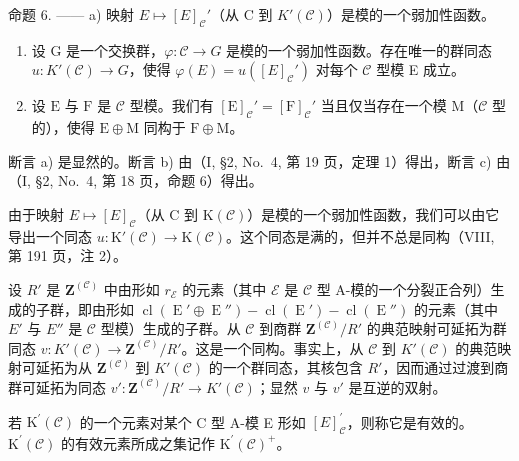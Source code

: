 命题 6. —— a) 映射 \(E \mapsto [E]_{\mathcal{C}}'\)（从 C 到 \(K'(\mathcal{C})\)）是模的一个弱加性函数。

\begin{enumerate}
\def\labelenumi{\alph{enumi})}
\setcounter{enumi}{1}
\item
  设 G 是一个交换群，\(\varphi : \mathcal{C} \to G\) 是模的一个弱加性函数。存在唯一的群同态 \(u: K'(\mathcal{C}) \to G\)，使得 \(\varphi(E) = u([E]_{\mathcal{C}}')\) 对每个 \(\mathcal{C}\) 型模 E 成立。
\item
  设 \(\mathrm{E}\) 与 \(\mathrm{F}\) 是 \(\mathcal{C}\) 型模。我们有 \([\mathrm{E}]_{\mathcal{C}}' = [\mathrm{F}]_{\mathcal{C}}'\) 当且仅当存在一个模 \(\mathrm{M}\)（\(\mathcal{C}\) 型的），使得 \(\mathrm{E} \oplus \mathrm{M}\) 同构于 \(\mathrm{F} \oplus \mathrm{M}\)。
\end{enumerate}

断言 a) 是显然的。断言 b) 由（I, §2, No.~4, 第 19 页，定理 1）得出，断言 c) 由（I, §2, No.~4, 第 18 页，命题 6）得出。

由于映射 \(E \mapsto [E]_{\mathcal{C}}\)（从 C 到 \(\mathrm{K}(\mathcal{C})\)）是模的一个弱加性函数，我们可以由它导出一个同态 \(u : \mathrm{K}'(\mathcal{C}) \to \mathrm{K}(\mathcal{C})\)。这个同态是满的，但并不总是同构（VIII, 第 191 页，注 2）。

设 \(R'\) 是 \(\mathbf{Z}^{(\mathcal{C})}\) 中由形如 \(r_{\mathcal{E}}\) 的元素（其中 \(\mathcal{E}\) 是 \(\mathcal{C}\) 型 A-模的一个分裂正合列）生成的子群，即由形如 \(\operatorname{cl}(\operatorname{E}' \oplus \operatorname{E}'') - \operatorname{cl}(\operatorname{E}') - \operatorname{cl}(\operatorname{E}'')\) 的元素（其中 \(E'\) 与 \(E''\) 是 \(\mathcal{C}\) 型模）生成的子群。从 \(\mathcal{C}\) 到商群 \(\mathbf{Z}^{(\mathcal{C})}/R'\) 的典范映射可延拓为群同态 \(v: K'(\mathcal{C}) \to \mathbf{Z}^{(\mathcal{C})}/R'\)。这是一个同构。事实上，从 \(\mathcal{C}\) 到 \(K'(\mathcal{C})\) 的典范映射可延拓为从 \(\mathbf{Z}^{(\mathcal{C})}\) 到 \(K'(\mathcal{C})\) 的一个群同态，其核包含 \(R'\)，因而通过过渡到商群可延拓为同态 \(v': \mathbf{Z}^{(\mathcal{C})}/R' \to K'(\mathcal{C})\)；显然 \(v\) 与 \(v'\) 是互逆的双射。

若 \(\mathrm{K}^{\prime}(\mathcal{C})\) 的一个元素对某个 C 型 A-模 E 形如 \([E]_{\mathcal{C}}^{\prime}\)，则称它是有效的。\(\mathrm{K}^{\prime}(\mathcal{C})\) 的有效元素所成之集记作 \(\mathrm{K}^{\prime}(\mathcal{C})^{+}\)。

